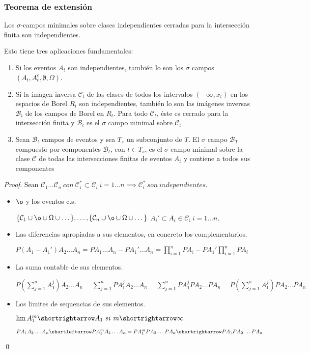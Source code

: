 \subsubsection{Teorema de extensión}
\begin{theorem}
Los $\sigma$-campos minimales sobre clases independientes cerradas para la intersección finita son independientes.
\end{theorem}
Esto tiene tres aplicaciones fundamentales:
\begin{enumerate}
\item Si los eventos $A_t$ son independientes, también lo son los $\sigma$ campos $(A_t , A_t^c , \emptyset , \Omega)$.
\item Si la imagen inversa $\mathcal{C}_t$ de las clases de todos los intervalos $(-\infty, x_t)$ en los espacios de Borel $R_t$ son independientes, también lo son las imágenes inversas $\mathcal{B}_t$ de los campos de Borel en $R_t$. Para todo $\mathcal{C}_t$, éste es cerrado para la intersección finita y $\mathcal{B}_t$ es el $\sigma$ campo minimal sobre $\mathcal{C}_t$
\item Sean $\mathcal{B}_t$ campos de eventos y sea $T_s$ un subconjunto de $T$. El $\sigma$ campo $\mathcal{B}_T$ compuesto por componentes $\mathcal{B}_t$, con $t\in T_s$, es el $\sigma$ campo minimal sobre la clase $\mathcal{C}$ de todas las intersecciones finitas de eventos $A_t$ y contiene a todos sus componentes
\end{enumerate}
\begin{proof}

Sean $\mathcal{C}_1 \dots \mathcal{C}_n \ con \ \mathcal{C}_i^* \subset \mathcal{C}_i \ i=1\dots n \implies \mathcal{C}_i^* \ son \ independientes.$
\\
\begin{itemize}
\item $\o$ y los eventos c.s.

$\{\mathcal{C}_1 \cup \o \cup \Omega \cup \dots \}, \dots , \{\mathcal{C}_n \cup \o \cup \Omega \cup \dots \}$ $A_i' \subset A_i \in \mathcal{C}_i \ i=1\dots n.$
\\
\item Las diferencias apropiadas a sus elementos, en concreto los complementarios.

$P(A_1 - A_1') A_2\dots A_n = PA_1\dots A_n - PA_1'\dots A_n = \prod_{i=1}^{n}PA_{i} - PA_1'\prod_{i=1}^{n}PA_i$
\\
\item La suma contable de sus elementos.

$P(\sum_{j=1}^{n}A_1^j)A_2\dots A_n = \sum_{j=1}^{n}PA_1^jA_2\dots A_n = \sum_{j=1}^{n}PA_1^jPA_2\dots PA_n = P(\sum_{j=1}^{n}A_1^j)PA_2\dots PA_n$
\\
\item Los limites de sequencias de sus elementos.

$\lim A_{1}^m \shortrightarrow A_{1} \ si \ m \shortrightarrow \infty$

$PA_1A_2\dots A_n \shortleftarrow PA_1^mA_2\dots A_n = PA_1^mPA_2\dots PA_n \shortrightarrow PA_1PA_2\dots PA_n$
\end{itemize}
\qed
\end{proof}
